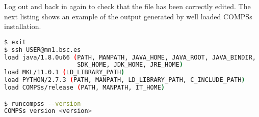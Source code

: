 Log out and back in again to check that the file has been correctly edited. The next listing shows an example of the
output generated by well loaded COMPSs installation. 
\begin{lstlisting}[language=bash]
$ exit
$ ssh USER@mn1.bsc.es
load java/1.8.0u66 (PATH, MANPATH, JAVA_HOME, JAVA_ROOT, JAVA_BINDIR,
                    SDK_HOME, JDK_HOME, JRE_HOME)
load MKL/11.0.1 (LD_LIBRARY_PATH)
load PYTHON/2.7.3 (PATH, MANPATH, LD_LIBRARY_PATH, C_INCLUDE_PATH)
load COMPSs/release (PATH, MANPATH, IT_HOME)

$ runcompss --version
COMPSs version <version>
\end{lstlisting}


